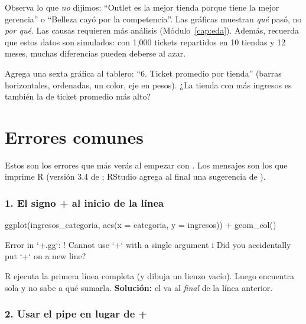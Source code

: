 \begin{advertencia}
Observa lo que \emph{no} dijimos: ``Outlet es la mejor tienda porque tiene
la mejor gerencia'' o ``Belleza cayó por la competencia''. Las gráficas
muestran \emph{qué} pasó, no \emph{por qué}. Las causas requieren más
análisis (Módulo~\ref{cap:eda}). Además, recuerda que estos datos son
simulados: con 1,000 tickets repartidos en 10 tiendas y 12 meses, muchas
diferencias pueden deberse al azar.
\end{advertencia}

\begin{hazlotu}
Agrega una sexta gráfica al tablero: ``6. Ticket promedio por tienda''
(barras horizontales, ordenadas, un color, eje en pesos). ¿La tienda con más
ingresos es también la de ticket promedio más alto?
\end{hazlotu}

\section{Errores comunes}
\label{sec:m3-errores}

Estos son los errores que más verás al empezar con . Los
mensajes son los que imprime R (versión 3.4 de ; RStudio
agrega al final una sugerencia de ).

\subsubsection{1. El signo + al inicio de la línea}

\begin{rnoejecutar}
ggplot(ingresos_categoria, aes(x = categoria, y = ingresos))
  + geom_col()
\end{rnoejecutar}
\begin{rsalida}
Error in `+.gg`:
! Cannot use `+` with a single argument
i Did you accidentally put `+` on a new line?
\end{rsalida}

R ejecuta la primera línea completa (y dibuja un lienzo vacío). Luego
encuentra  sola y no sabe a qué sumarla.
\textbf{Solución:} el \codigo{+} va al \emph{final} de la línea anterior.

\subsubsection{2. Usar el pipe en lugar de +}

